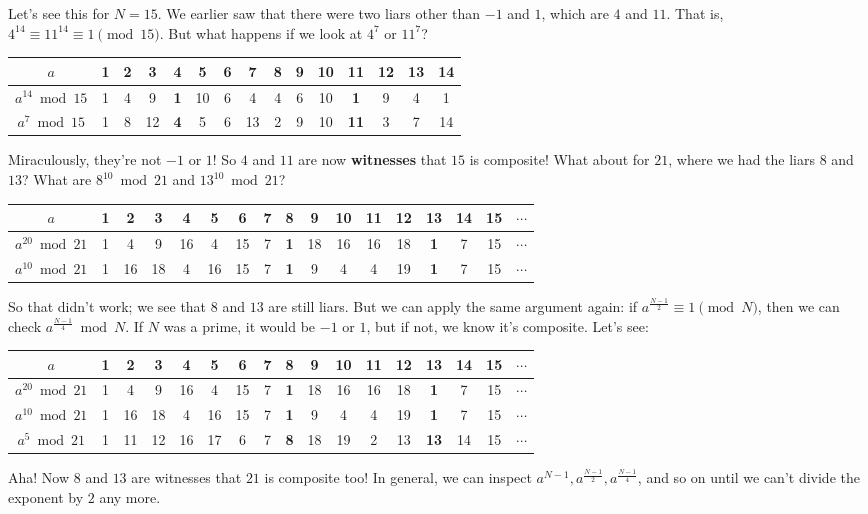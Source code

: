 \documentclass[11pt,paper=letter]{scrartcl}
\begin{document}
Let's see this for $N = 15$. We earlier saw that there were two liars other than $-1$ and $1$, which are $4$ and $11$. That is, $4^{14} \equiv 11^{14} \equiv 1 \pmod {15}$. But what happens if we look at $4^7$ or $11^7$?
\begin{center}
  \begin{tabular}{c|cccccccccccccc}
  $a$ & 1 & 2 & 3 & \textbf{4} & 5 & 6 & 7 & 8 & 9 & 10 & \textbf{11} & 12 & 13 & 14 \\ \hline
  $a^{14}\bmod 15$ & 1 & 4 & 9 & \textbf{1} & 10 & 6 & 4 & 4 & 6 & 10 & \textbf{1} & 9 & 4 & 1 \\
  $a^{7}\bmod 15$ & 1 & 8 & 12 & \textbf{4} & 5 & 6 & 13 & 2 & 9 & 10 & \textbf{11} & 3 & 7 & 14
  \end{tabular}
\end{center}
Miraculously, they're not $-1$ or $1$! So $4$ and $11$ are now \textbf{witnesses} that $15$ is composite! What about for $21$, where we had the liars $8$ and $13$? What are $8^{10} \bmod 21$ and $13^{10} \bmod 21$?
\begin{center}
  \begin{tabular}{c|cccccccccccccccc}
  $a$ & 1 & 2 & 3 & 4 & 5 & 6 & 7 & \textbf{8} & 9 & 10 & 11 & 12 & \textbf{13} & 14 & 15 & $\cdots$ \\ \hline
  $a^{20}\bmod 21$ & 1 & 4 & 9 & 16 & 4 & 15 & 7 & \textbf{1} & 18 & 16 & 16 & 18 & \textbf{1} & 7 & 15 & $\cdots$ \\
  $a^{10}\bmod 21$ & 1 & 16 & 18 & 4 & 16 & 15 & 7 & \textbf{1} & 9 & 4 & 4 & 19 & \textbf{1} & 7 & 15 & $\cdots$
  \end{tabular}
\end{center}
So that didn't work; we see that $8$ and $13$ are still liars. But we can apply the same argument again: if $a^{\frac{N-1}2} \equiv 1 \pmod N$, then we can check $a^{\frac{N-1}4} \bmod N$. If $N$ was a prime, it would be $-1$ or $1$, but if not, we know it's composite. Let's see:
\begin{center}
  \begin{tabular}{c|cccccccccccccccc}
  $a$ & 1 & 2 & 3 & 4 & 5 & 6 & 7 & \textbf{8} & 9 & 10 & 11 & 12 & \textbf{13} & 14 & 15 & $\cdots$ \\ \hline
  $a^{20}\bmod 21$ & 1 & 4 & 9 & 16 & 4 & 15 & 7 & \textbf{1} & 18 & 16 & 16 & 18 & \textbf{1} & 7 & 15 & $\cdots$ \\
  $a^{10}\bmod 21$ & 1 & 16 & 18 & 4 & 16 & 15 & 7 & \textbf{1} & 9 & 4 & 4 & 19 & \textbf{1} & 7 & 15 & $\cdots$ \\
  $a^{5}\bmod 21$ & 1 & 11 & 12 & 16 & 17 & 6 & 7 & \textbf{8} & 18 & 19 & 2 & 13 & \textbf{13} & 14 & 15 & $\cdots$
  \end{tabular}
\end{center}
Aha! Now $8$ and $13$ are witnesses that $21$ is composite too! In general, we can inspect $a^{N-1}, a^{\frac{N-1}2}, a^{\frac{N-1}{4}}$, and so on until we can't divide the exponent by $2$ any more.
\end{document}
